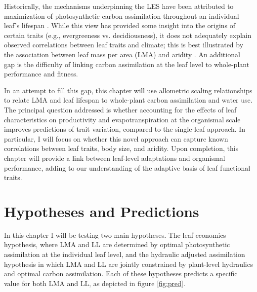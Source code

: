 Historically, the mechanisms underpinning the LES have been attributed to maximization of photosynthetic carbon assimilation throughout an individual leaf's lifespan \cite{wang2023a, kikuzawa_cost-benefit_1991}. While this view has provided some insight into the origins of certain traits (e.g., evergreeness vs. decidiousness), it does not adequately explain observed correlations between leaf traits and climate; this is best illustrated by the association between leaf mass per area (LMA) and aridity \cite{mitchell_leaf_2008}. An additional gap is the difficulty of linking carbon assimilation at the leaf level to whole-plant performance and fitness. 





In an attempt to fill this gap, this chapter will use allometric scaling relationships to relate LMA and leaf lifespan to whole-plant carbon assimilation and water use. The principal question addressed is whether accounting for the effects of leaf characteristics on productivity and evapotranspiration at the organismal scale improves predictions of trait variation, compared to the single-leaf approach. In particular, I will focus on whether this novel approach can capture known correlations between leaf traits, body size, and aridity. Upon completion, this chapter will provide a link between leaf-level adaptations and organismal performance, adding to our understanding of the adaptive basis of leaf functional traits.

\section{Hypotheses and Predictions}

In this chapter I will be testing two main hypotheses. The leaf economics hypothesis, where LMA and LL are determined by optimal photosynthetic assimilation at the individual leaf level, and the hydraulic adjusted assimilation hypothesis in which LMA and LL are jointly constrained by plant-level hydraulics and optimal carbon assimilation. Each of these hypotheses predicts a specific value for both LMA and LL, as depicted in figure \ref{fig:pred}.


